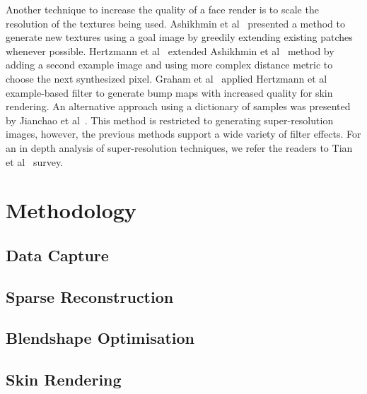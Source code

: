 \documentclass[11pt]{article}
\begin{document}
Another technique to increase the quality of a face render is to scale the resolution of the textures being used.
Ashikhmin et al~\cite{Ashikhmin2001} presented a method to generate new textures using a goal image by greedily extending existing patches whenever possible.
Hertzmann et al~\cite{Hertzmann2001} extended Ashikhmin et al~\cite{Ashikhmin2001} method by adding a second example image and using more complex distance metric to choose the next synthesized pixel.
Graham et al~\cite{Graham2013} applied Hertzmann et al~\cite{Hertzmann2001} example-based filter to generate bump maps with increased quality for skin rendering.
An alternative approach using a dictionary of samples was presented by Jianchao et al~\cite{Jianchao2010}.
This method is restricted to generating super-resolution images, however, the previous methods support a wide variety of filter effects.
For an in depth analysis of super-resolution techniques, we refer the readers to Tian et al~\cite{Tian2011} survey.




\section{Methodology}
\label{sec:methods}


\subsection{Data Capture}


\subsection{Sparse Reconstruction}


\subsection{Blendshape Optimisation}


\subsection{Skin Rendering}
\end{document}
